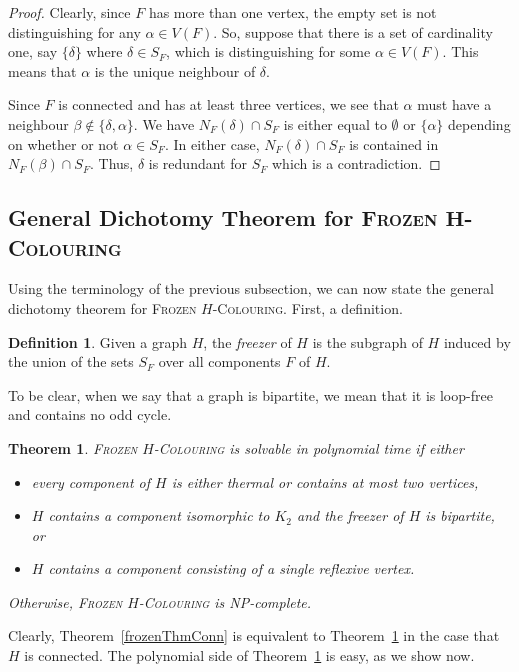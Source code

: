 \documentclass[11 pt]{amsart}
\newtheorem{thm}[equation]{Theorem}
\theoremstyle{definition}
\newtheorem{defn}[equation]{Definition}
\theoremstyle{case}
\numberwithin{equation}{section}
\newcommand\Hfrz[1]{\textsc{Frozen $#1$-Colouring}}
\begin{document}
\begin{proof}
Clearly, since $F$ has more than one vertex, the empty set is not distinguishing for any $\alpha\in V(F)$. So, suppose that there is a set of cardinality one, say $\{\delta\}$ where $\delta \in S_F$, which is distinguishing for some $\alpha\in V(F)$. This means that $\alpha$ is the unique neighbour of $\delta$. 

Since $F$ is connected and has at least three vertices, we see that $\alpha$ must have a neighbour $\beta\notin\{\delta,\alpha\}$. We have $N_F(\delta)\cap S_F$ is either equal to $\emptyset$ or $\{\alpha\}$ depending on whether or not $\alpha\in S_F$. In either case, $N_F(\delta)\cap S_F$ is contained in $N_F(\beta)\cap S_F$. Thus, $\delta$ is redundant for $S_F$ which is a contradiction. 
\end{proof}

\subsection{General Dichotomy Theorem for \texorpdfstring{\Hfrz{\boldsymbol{H}}}{Frozen H-Colouring}}

Using the terminology of the previous subsection, we can now state the general dichotomy theorem for \Hfrz{H}. First, a definition.

\begin{defn}
Given a graph $H$, the \emph{freezer} of $H$ is the subgraph of $H$ induced by the union of the sets $S_F$ over all components $F$ of $H$. 
\end{defn}

To be clear, when we say that a graph is bipartite, we mean that it is loop-free and contains no odd cycle. 

\begin{thm}
\label{frozenThmGeneral}
\Hfrz{H} is solvable in polynomial time if either
\begin{itemize}
\item every component of $H$ is either thermal or contains at most two vertices, 
\item $H$ contains a component isomorphic to $K_2$ and the freezer of $H$ is bipartite, or
\item $H$ contains a component consisting of a single reflexive vertex.
\end{itemize}
Otherwise, \Hfrz{H} is NP-complete. 
\end{thm}


Clearly, Theorem~\ref{frozenThmConn} is equivalent to  Theorem~\ref{frozenThmGeneral} in the case that $H$ is connected. The polynomial side of Theorem~\ref{frozenThmGeneral} is easy, as we show now.
\end{document}
